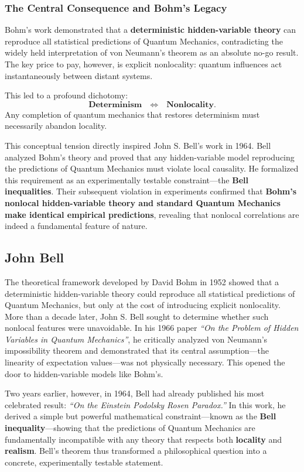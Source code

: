 \subsubsection{The Central Consequence and Bohm’s Legacy}

Bohm’s work demonstrated that a \textbf{deterministic hidden-variable theory} can reproduce all statistical predictions of Quantum Mechanics, contradicting the widely held interpretation of von Neumann’s theorem as an absolute no-go result.  
The key price to pay, however, is explicit nonlocality: quantum influences act instantaneously between distant systems.

This led to a profound dichotomy:
\[
\textbf{Determinism} \quad \Longleftrightarrow \quad \textbf{Nonlocality.}
\]
Any completion of quantum mechanics that restores determinism must necessarily abandon locality.  

This conceptual tension directly inspired John S. Bell’s work in 1964.  
Bell analyzed Bohm’s theory and proved that any hidden-variable model reproducing the predictions of Quantum Mechanics must violate local causality.  
He formalized this requirement as an experimentally testable constraint—the \textbf{Bell inequalities}.  
Their subsequent violation in experiments confirmed that \textbf{Bohm’s nonlocal hidden-variable theory and standard Quantum Mechanics make identical empirical predictions}, revealing that nonlocal correlations are indeed a fundamental feature of nature.


\subsection{John Bell}

The theoretical framework developed by David Bohm in 1952 showed that a deterministic hidden-variable theory could reproduce all statistical predictions of Quantum Mechanics, but only at the cost of introducing explicit nonlocality.  
More than a decade later, John S. Bell sought to determine whether such nonlocal features were unavoidable.  
In his 1966 paper \textit{“On the Problem of Hidden Variables in Quantum Mechanics”}, he critically analyzed von Neumann’s impossibility theorem and demonstrated that its central assumption—the linearity of expectation values—was not physically necessary.  
This opened the door to hidden-variable models like Bohm’s.  

Two years earlier, however, in 1964, Bell had already published his most celebrated result: \textit{“On the Einstein Podolsky Rosen Paradox.”}  
In this work, he derived a simple but powerful mathematical constraint—known as the \textbf{Bell inequality}—showing that the predictions of Quantum Mechanics are fundamentally incompatible with any theory that respects both \textbf{locality} and \textbf{realism}.  
Bell’s theorem thus transformed a philosophical question into a concrete, experimentally testable statement.

